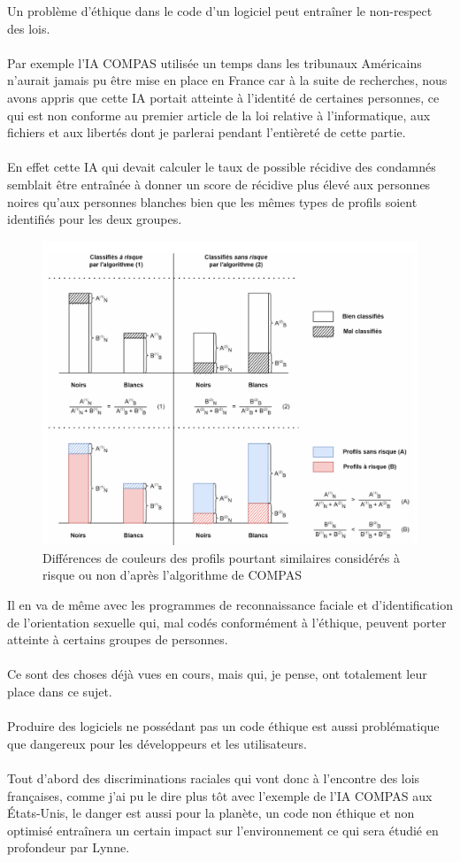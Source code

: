 \documentclass{article}
\begin{document}
Un problème d'éthique dans le code d'un logiciel peut entraîner le non-respect des lois.\\\\
Par exemple l'IA COMPAS utilisée un temps dans les tribunaux Américains n'aurait jamais pu être mise en place en France car à la suite de recherches, nous avons appris que cette IA portait atteinte à l'identité de certaines personnes, ce qui est non conforme au premier article de la loi relative à l'informatique, aux fichiers et aux libertés dont je parlerai pendant l'entièreté de cette partie.\\\\
En effet cette IA qui devait calculer le taux de possible récidive des condamnés semblait être entraînée à donner un score de récidive plus élevé aux personnes noires qu’aux personnes blanches bien que les mêmes types de profils soient identifiés pour les deux groupes.
\begin{figure}[h]
    \centering
    \includegraphics[width=0.5\linewidth]{images/Graphique COMPAS.PNG}
    \caption{Différences de couleurs des profils pourtant similaires considérés à risque ou non d'après l'algorithme de COMPAS\cite{noauthor_compas_nodate}}
    \label{COMPAS graph}
\end{figure}
Il en va de même avec les programmes de reconnaissance faciale et d'identification de l'orientation sexuelle qui, mal codés conformément à l'éthique, peuvent porter atteinte à certains groupes de personnes.\\
\\ Ce sont des choses déjà vues en cours, mais qui, je pense, ont totalement leur place dans ce sujet.\\
\\ Produire des logiciels ne possédant pas un code éthique est aussi problématique que dangereux pour les développeurs et les utilisateurs.\\\\

 Tout d'abord des discriminations raciales qui vont donc à l'encontre des lois françaises, comme j'ai pu le dire plus tôt avec l'exemple de l'IA COMPAS aux États-Unis, le danger est aussi pour la planète, un code non éthique et non optimisé entraînera un certain impact sur l'environnement ce qui sera étudié en profondeur par Lynne.\\\\
\end{document}
